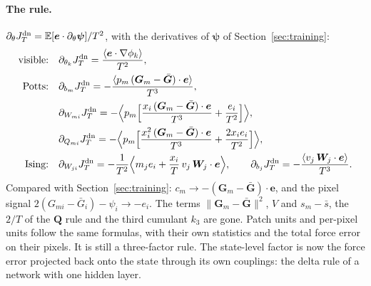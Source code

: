 \documentclass[11pt,a4paper]{article}
\newcommand{\E}{\mathbb{E}}
\newcommand{\grad}{\nabla}
\begin{document}
\paragraph{The rule.} $\partial_\theta J^{\rm dn}_T=\E[\bm e\cdot\partial_\theta\bm\psi]/T^2$, with the derivatives
of $\bm\psi$ of Section~\ref{sec:training}:
\begin{align}
  \text{visible:}\quad&\partial_{\theta_k}J^{\rm dn}_T=\frac{\langle\bm e\cdot\grad\phi_k\rangle}{T^2},\\
  \text{Potts:}\quad&\partial_{b_m}J^{\rm dn}_T=-\frac{\langle p_m\,(\bm G_m-\bar{\bm G})\cdot\bm e\rangle}{T^3},\\
  &\partial_{W_{mi}}J^{\rm dn}_T=-\Big\langle p_m\Big[\frac{x_i\,(\bm G_m-\bar{\bm G})\cdot\bm e}{T^3}+\frac{e_i}{T^2}\Big]\Big\rangle,\\
  &\partial_{Q_{mi}}J^{\rm dn}_T=-\Big\langle p_m\Big[\frac{x_i^2\,(\bm G_m-\bar{\bm G})\cdot\bm e}{T^3}+\frac{2x_ie_i}{T^2}\Big]\Big\rangle,\\
  \text{Ising:}\quad&\partial_{W_{ji}}J^{\rm dn}_T=-\frac1{T^2}\Big\langle m_je_i+\frac{x_i}{T}\,v_j\,\bm W_j\cdot\bm e\Big\rangle,\qquad
  \partial_{b_j}J^{\rm dn}_T=-\frac{\langle v_j\,\bm W_j\cdot\bm e\rangle}{T^3}.
\end{align}
Compared with Section~\ref{sec:training}: $c_m\to-(\bm G_m-\bar{\bm G})\cdot\bm e$, and the pixel signal
$2(G_{mi}-\bar G_i)-\psi_i\to-e_i$. The terms $\|\bm G_m-\bar{\bm G}\|^2$, $V$ and $s_m-\bar s$, the $2/T$ of the
$\bm Q$ rule and the third cumulant $k_3$ are gone. Patch units and per-pixel units follow the same formulas, with
their own statistics and the total force error on their pixels. It is still a three-factor rule. The state-level
factor is now the force error projected back onto the state through its own couplings: the delta rule of a network
with one hidden layer.
\end{document}
